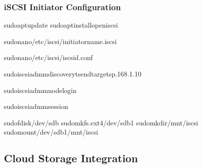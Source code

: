 \documentclass[letterpaper,10pt,english]{sphinxmanual}
\begin{document}
\subsubsection{iSCSI Initiator Configuration}
\label{\detokenize{network-storage:iscsi-initiator-configuration}}
\begin{sphinxVerbatim}[commandchars=\\\{\}]
sudoaptupdate
sudoaptinstallopen\PYGZhy{}iscsi

sudonano/etc/iscsi/initiatorname.iscsi

sudonano/etc/iscsi/iscsid.conf

sudoiscsiadm\PYGZhy{}mdiscovery\PYGZhy{}tsendtargets\PYGZhy{}p.168.1.10

sudoiscsiadm\PYGZhy{}mnode\PYGZhy{}\PYGZhy{}login

sudoiscsiadm\PYGZhy{}msession

sudofdisk/dev/sdb
sudomkfs.ext4/dev/sdb1
sudomkdir/mnt/iscsi
sudomount/dev/sdb1/mnt/iscsi
\end{sphinxVerbatim}


\subsection{Cloud Storage Integration}
\label{\detokenize{network-storage:cloud-storage-integration}}
\end{document}
